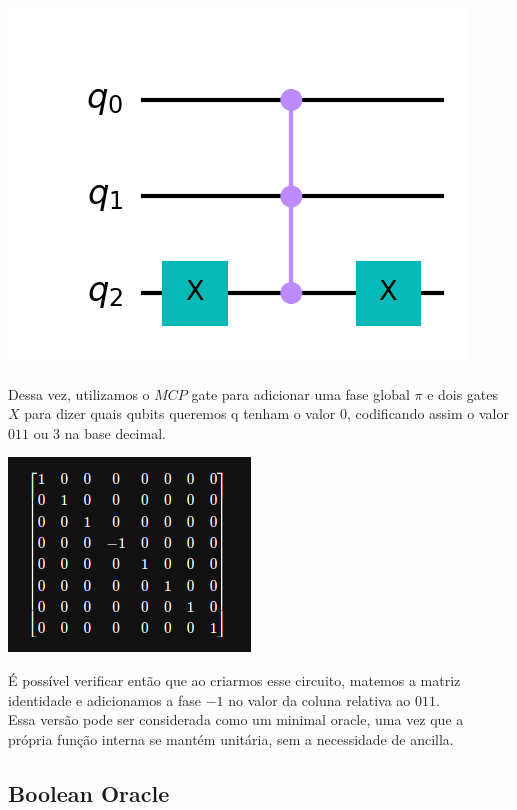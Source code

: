 \documentclass{article}
\begin{document}
\begin{center}
	\includegraphics[scale=0.3]{phase_oracle_2.png}
	\label{fig:phase-oracle-2}
\end{center}


Dessa vez, utilizamos o $MCP$ gate para adicionar uma fase global $\pi$ e dois gates $X$ para dizer quais qubits queremos q tenham o valor 0, codificando assim o valor $011$ ou $3$ na base decimal.

\begin{center}
	\includegraphics[scale=0.5]{phase_oracle_unitary.png}
	\label{fig:phase-oracle-unitary}
\end{center}

É possível verificar então que ao criarmos esse circuito, matemos a matriz identidade e adicionamos a fase $-1$ no valor da coluna relativa ao $011$. \\
Essa versão pode ser considerada como um minimal oracle, uma vez que a própria função interna se mantém unitária, sem a necessidade de ancilla.


\subsection{Boolean Oracle}
\end{document}
